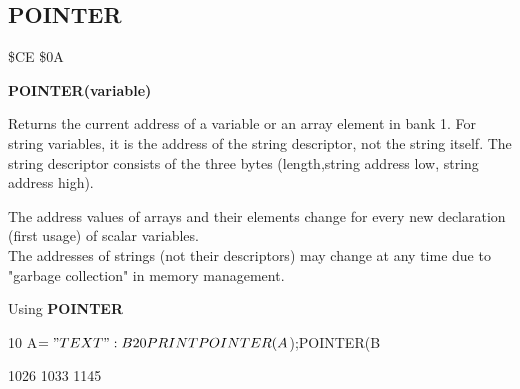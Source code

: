 \subsection{POINTER}
\begin{description}[leftmargin=3cm,style=nextline]
\item [Token:] \$CE \$0A
\item [Format:] {\bf POINTER(variable)}
\item [Usage:]  Returns the current address of a variable
                or an array element in bank 1.
                For string variables, it is the address of
                the string descriptor, not the string itself.
                The string descriptor consists of the three bytes
                (length,string address low, string address high).


\item [Remarks:] The address values of arrays and their elements
                 change for every new declaration
                 (first usage) of scalar variables. \\
                 The addresses of strings (not their descriptors)
                 may change at any time due to
                 "garbage collection" in memory management.


\item [Example:] Using {\bf POINTER}

\begin{screenoutput}
 10 A$="TEXT": B%
 20 PRINT POINTER(A$);POINTER(B%

 1026 1033 1145
\end{screenoutput}
\end{description}


\newpage
